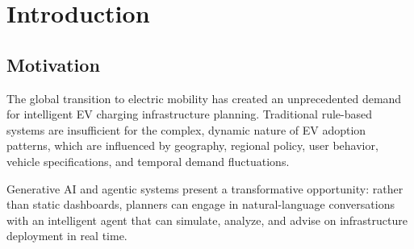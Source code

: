\documentclass[12pt,a4paper]{article}
\begin{document}
\begin{abstract}
\noindent
This report presents the design, implementation, and evaluation of an \textbf{Agentic EV Infrastructure Planner}---a state-of-the-art Generative AI application that combines agentic workflows, retrieval-augmented generation (RAG), machine learning forecasting, and a conversational user interface to provide data-driven recommendations for electric vehicle (EV) charging infrastructure. The system ingests user-defined geographic and regional parameters, simulates EV charging sessions using stochastic modeling, predicts energy demand via a pre-trained regression model, retrieves relevant regulatory guidelines through a RAG pipeline, and synthesizes actionable infrastructure plans using a large language model (LLM). The entire processing pipeline is orchestrated as a stateful directed acyclic graph (DAG) using \textbf{LangGraph}, and the interface is exposed through a premium \textbf{Streamlit} web application with conversational multi-turn capabilities and dynamic data visualizations. This document serves as a comprehensive technical reference, covering system architecture, component-wise explanation, data flow, model analysis, and qualitative results.
\end{abstract}

\newpage

\section{Introduction}

\subsection{Motivation}
The global transition to electric mobility has created an unprecedented demand for intelligent EV charging infrastructure planning. Traditional rule-based systems are insufficient for the complex, dynamic nature of EV adoption patterns, which are influenced by geography, regional policy, user behavior, vehicle specifications, and temporal demand fluctuations.

Generative AI and agentic systems present a transformative opportunity: rather than static dashboards, planners can engage in natural-language conversations with an intelligent agent that can simulate, analyze, and advise on infrastructure deployment in real time.
\end{document}
